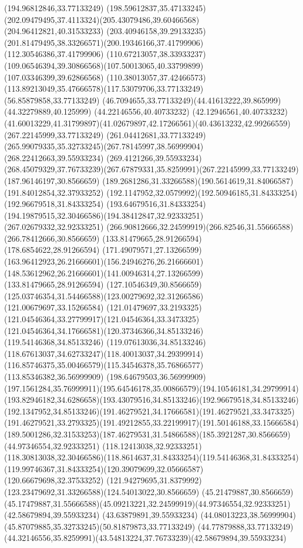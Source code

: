 {{	\lineto(194.96812846,33.77133249)
	\curveto(198.59612837,35.47133245)(202.09479495,37.4113324)(205.43079486,39.60466568)
	\lineto(204.96412821,40.31533233)
	\curveto(203.40946158,39.29133235)(201.81479495,38.33266571)(200.19346166,37.41799906)
	\lineto(112.30546386,37.41799906)
	\curveto(110.67213057,38.33933237)(109.06546394,39.30866568)(107.50013065,40.33799899)
	\lineto(107.03346399,39.62866568)
	\curveto(110.38013057,37.42466573)(113.89213049,35.47666578)(117.53079706,33.77133249)
	\lineto(56.85879858,33.77133249)
	\curveto(46.7094655,33.77133249)(44.41613222,39.865999)(44.32279889,40.125999)
	\lineto(44.22146556,40.40733232)
	\lineto(42.12946561,40.40733232)
	\curveto(41.60013229,41.31799897)(41.02679897,42.17266561)(40.43613232,42.99266559)
	\closepath
	\moveto(267.22145999,33.77133249)
	\lineto(261.04412681,33.77133249)
	\curveto(265.99079335,35.32733245)(267.78145997,38.56999904)(268.22412663,39.55933234)
	\lineto(269.4121266,39.55933234)
	\curveto(268.45079329,37.76733239)(267.67879331,35.8259991)(267.22145999,33.77133249)
	\moveto(187.96146197,30.8566659)
	\curveto(189.2681286,31.33266588)(190.5614619,31.84066587)(191.84012854,32.37933252)
	\curveto(192.1147952,32.0579992)(192.50946185,31.84333254)(192.96679518,31.84333254)
	\curveto(193.64679516,31.84333254)(194.19879515,32.30466586)(194.38412847,32.92333251)
	\lineto(267.02679332,32.92333251)
	\curveto(266.90812666,32.24599919)(266.82546,31.55666588)(266.78412666,30.8566659)
	\closepath
	\moveto(133.81479665,28.91266594)
	\lineto(178.6854622,28.91266594)
	\curveto(171.49079571,27.13266599)(163.96412923,26.21666601)(156.24946276,26.21666601)
	\curveto(148.53612962,26.21666601)(141.00946314,27.13266599)(133.81479665,28.91266594)
	\moveto(127.10546349,30.8566659)
	\curveto(125.03746354,31.54466588)(123.00279692,32.31266586)(121.00679697,33.15266584)
	\curveto(121.01479697,33.2193325)(121.04546364,33.27799917)(121.04546364,33.3473325)
	\curveto(121.04546364,34.17666581)(120.37346366,34.85133246)(119.54146368,34.85133246)
	\curveto(119.07613036,34.85133246)(118.67613037,34.62733247)(118.40013037,34.29399914)
	\curveto(116.85746375,35.00466579)(115.34546378,35.76866577)(113.85346382,36.56999909)
	\lineto(198.64679503,36.56999909)
	\curveto(197.1561284,35.76999911)(195.64546178,35.00866579)(194.10546181,34.29799914)
	\curveto(193.82946182,34.6286658)(193.43079516,34.85133246)(192.96679518,34.85133246)
	\curveto(192.1347952,34.85133246)(191.46279521,34.17666581)(191.46279521,33.3473325)
	\curveto(191.46279521,33.2793325)(191.49212855,33.22199917)(191.50146188,33.15666584)
	\curveto(189.5001286,32.31533253)(187.46279531,31.54866588)(185.3921287,30.8566659)
	\closepath
	\moveto(44.97346554,32.92333251)
	\lineto(118.12413038,32.92333251)
	\curveto(118.30813038,32.30466586)(118.8614637,31.84333254)(119.54146368,31.84333254)
	\curveto(119.99746367,31.84333254)(120.39079699,32.05666587)(120.66679698,32.37533252)
	\curveto(121.94279695,31.8379992)(123.23479692,31.33266588)(124.54013022,30.8566659)
	\lineto(45.21479887,30.8566659)
	\curveto(45.17479887,31.55666588)(45.09213221,32.24599919)(44.97346554,32.92333251)
	\moveto(42.58679894,39.55933234)
	\lineto(43.63879891,39.55933234)
	\curveto(44.08013223,38.56999904)(45.87079885,35.32733245)(50.81879873,33.77133249)
	\lineto(44.77879888,33.77133249)
	\curveto(44.32146556,35.8259991)(43.54813224,37.76733239)(42.58679894,39.55933234)
}
}

